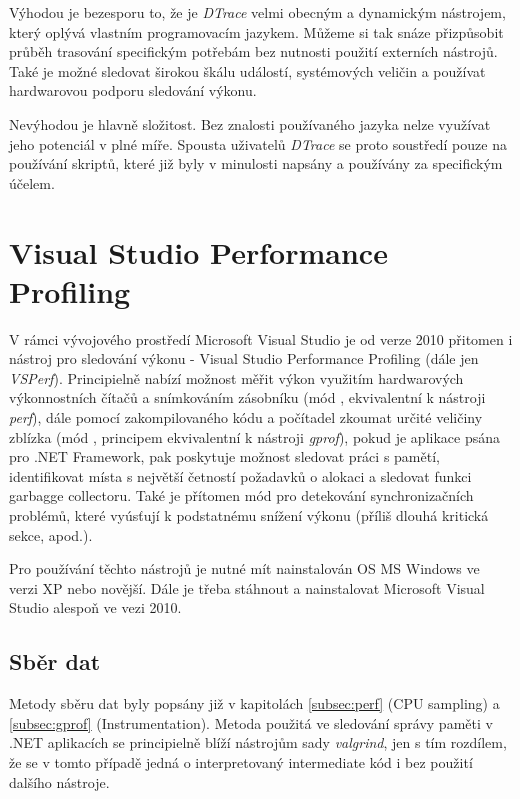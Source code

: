 \documentclass[czech,BP]{thesiskiv}
\begin{document}
Výhodou je bezesporu to, že je \emph{DTrace} velmi obecným a dynamickým nástrojem, který oplývá vlastním programovacím jazykem. Můžeme si tak snáze přizpůsobit průběh trasování specifickým potřebám bez nutnosti použití externích nástrojů. Také je možné sledovat širokou škálu událostí, systémových veličin a používat hardwarovou podporu sledování výkonu.

Nevýhodou je hlavně složitost. Bez znalosti používaného jazyka nelze využívat jeho potenciál v plné míře. Spousta uživatelů \emph{DTrace} se proto soustředí pouze na používání skriptů, které již byly v minulosti napsány a používány za specifickým účelem.




\section{Visual Studio Performance Profiling}

V rámci vývojového prostředí Microsoft Visual Studio je od verze 2010 přitomen i nástroj pro sledování výkonu - Visual Studio Performance Profiling (dále jen \emph{VSPerf})\cite{vsperf}. Principielně nabízí možnost měřit výkon využitím hardwarových výkonnostních čítačů a snímkováním zásobníku (mód , ekvivalentní k nástroji \emph{perf}), dále pomocí zakompilovaného kódu a počítadel zkoumat určité veličiny zblízka (mód , principem ekvivalentní k nástroji \emph{gprof}), pokud je aplikace psána pro .NET Framework, pak poskytuje možnost sledovat práci s pamětí, identifikovat místa s největší četností požadavků o alokaci a sledovat funkci garbagge collectoru. Také je přítomen mód pro detekování synchronizačních problémů, které vyúsťují k podstatnému snížení výkonu (příliš dlouhá kritická sekce, apod.).

Pro používání těchto nástrojů je nutné mít nainstalován OS MS Windows ve verzi XP nebo novější. Dále je třeba stáhnout a nainstalovat Microsoft Visual Studio alespoň ve vezi 2010.

\subsection*{Sběr dat}

Metody sběru dat byly popsány již v kapitolách \ref{subsec:perf} (CPU sampling) a \ref{subsec:gprof} (Instrumentation). Metoda použitá ve sledování správy paměti v .NET aplikacích se principielně blíží nástrojům sady \emph{valgrind}, jen s tím rozdílem, že se v tomto případě jedná o interpretovaný intermediate kód i bez použití dalšího nástroje.
\end{document}
